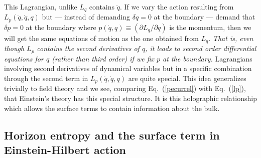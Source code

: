 \documentclass[12pt]{iopart}
\def\eq#1{{Eq.~(\ref{#1})}}
\begin{document}
This Lagrangian, unlike $L_q$ contains $\ddot q$. If we  vary the action resulting from 
$L_p (\ddot q, \dot q, q)$ 
but --- instead of demanding $\delta q=0$ at the boundary --- demand that $\delta p=0$ at the boundary where $p(\dot q,q)\equiv (\partial L_q/\partial \dot q)$ is the momentum,
then we will 
get the same equations of motion as the one obtained from $L_q$. \textit{That is, even though 
$L_p$ contains the second derivatives of $q$, it leads to second order differential equations
for $q$ (rather than third order) if we fix $p$ at the boundary.}
 Lagrangians involving second derivatives
of dynamical variables but in a specific combination through the second term in $L_p (\ddot q, \dot q, q)$  are quite special. This idea generalizes trivially to field theory
and we see, comparing \eq{pecurrel} with \eq{lp}, that Einstein's theory has this special structure.
It is this holographic relationship which allows the surface terms to contain information about the bulk. 

\subsection{Horizon entropy and the surface term in Einstein-Hilbert action}
\end{document}
